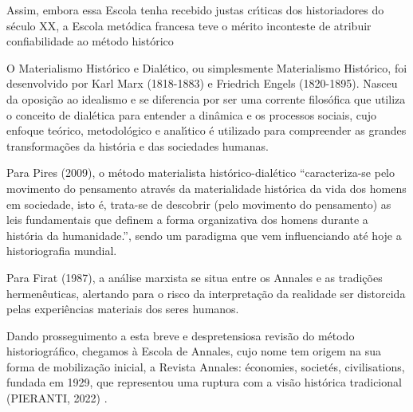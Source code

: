 \documentclass[
12pt,		%
openright,	%
twoside,  %
a4paper,			%
chapter=TITLE,		%
english,			%
french,				%
spanish,			%
brazil				%
]{USPSC-classe/USPSC}
\begin{document}
Assim, embora essa Escola tenha recebido justas cr\'{\i}ticas dos historiadores do s\'eculo XX, a Escola met\'odica francesa teve o m\'erito inconteste de atribuir confiabilidade ao m\'etodo hist\'orico









O Materialismo Hist\'orico e Dial\'etico, ou simplesmente Materialismo Hist\'orico, foi desenvolvido  por Karl Marx (1818-1883) e Friedrich Engels (1820-1895). Nasceu da oposi\c{c}\~ao ao idealismo e se diferencia por ser uma corrente filos\'ofica que utiliza o conceito de dial\'etica para entender a din\^amica e os processos sociais, cujo enfoque te\'orico, metodol\'ogico e anal\'{\i}tico \'e utilizado para compreender as grandes transforma\c{c}\~oes da hist\'oria e das sociedades humanas.









Para  Pires (2009), o m\'etodo materialista hist\'orico-dial\'etico “caracteriza-se pelo movimento do pensamento atrav\'es da materialidade hist\'orica da vida dos homens em sociedade, isto \'e, trata-se de descobrir (pelo movimento do pensamento) as leis fundamentais que definem a forma organizativa dos homens durante a hist\'oria da humanidade.”, sendo um paradigma que vem influenciando at\'e hoje a historiografia mundial.









Para Firat (1987), \textquotedbl a an\'alise marxista se situa entre os Annales e as tradi\c{c}\~oes hermen\^euticas\textquotedbl , alertando para o risco da interpreta\c{c}\~ao da realidade ser distorcida pelas \textquotedbl experi\^encias materiais dos seres humanos\textquotedbl .









Dando prosseguimento a esta breve e despretensiosa revis\~ao do m\'etodo historiogr\'afico, chegamos \`a Escola de Annales, cujo nome tem origem na sua forma de mobiliza\c{c}\~ao inicial, a Revista Annales: \'economies, societ\'es, civilisations, fundada em 1929, que representou uma ruptura com a vis\~ao hist\'orica tradicional (PIERANTI, 2022) .
\end{document}
